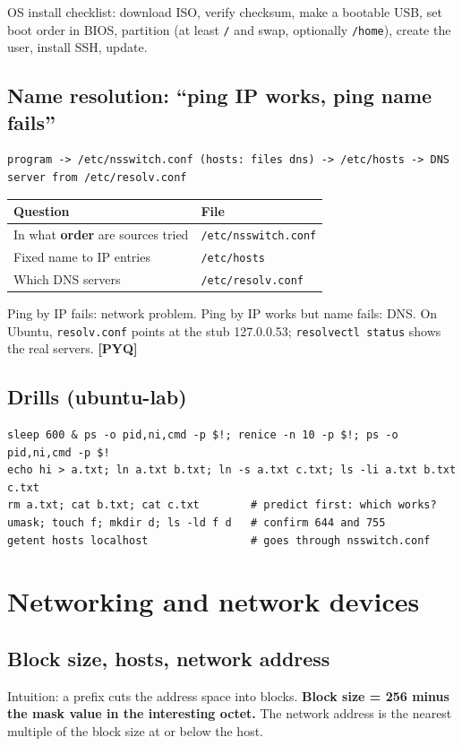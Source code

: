 \documentclass[11pt,a4paper]{article}
\newcommand{\pyq}{\textcolor{ember}{\scriptsize\textbf{[PYQ]}}}
\begin{document}
OS install checklist: download ISO, verify checksum, make a bootable USB, set boot order in BIOS, partition (at least \texttt{/} and swap, optionally \texttt{/home}), create the user, install SSH, update.

\subsection{Name resolution: ``ping IP works, ping name fails''}
\begin{lstlisting}
program -> /etc/nsswitch.conf (hosts: files dns) -> /etc/hosts -> DNS server from /etc/resolv.conf
\end{lstlisting}
\begin{center}\small\renewcommand{\arraystretch}{1.18}\setlength{\tabcolsep}{9pt}
\begin{tabularx}{\linewidth}{@{}>{\raggedright\arraybackslash}X>{\raggedright\arraybackslash}X@{}}
\toprule
\textbf{\color{slate}Question} & \textbf{\color{slate}File} \\ \midrule
In what \textbf{order} are sources tried & \texttt{/etc/nsswitch.conf} \\
Fixed name to IP entries & \texttt{/etc/hosts} \\
Which DNS servers & \texttt{/etc/resolv.conf} \\
\bottomrule
\end{tabularx}\end{center}
Ping by IP fails: network problem. Ping by IP works but name fails: DNS. On Ubuntu, \texttt{resolv.conf} points at the stub 127.0.0.53; \texttt{resolvectl status} shows the real servers. \pyq{}

\subsection*{Drills (ubuntu-lab)}
\begin{lstlisting}
sleep 600 & ps -o pid,ni,cmd -p $!; renice -n 10 -p $!; ps -o pid,ni,cmd -p $!
echo hi > a.txt; ln a.txt b.txt; ln -s a.txt c.txt; ls -li a.txt b.txt c.txt
rm a.txt; cat b.txt; cat c.txt        # predict first: which works?
umask; touch f; mkdir d; ls -ld f d   # confirm 644 and 755
getent hosts localhost                # goes through nsswitch.conf
\end{lstlisting}
\clearpage
\section{Networking and network devices}
\subsection{Block size, hosts, network address}
Intuition: a prefix cuts the address space into blocks. \textbf{Block size = 256 minus the mask value in the interesting octet.} The network address is the nearest multiple of the block size at or below the host.
\end{document}
